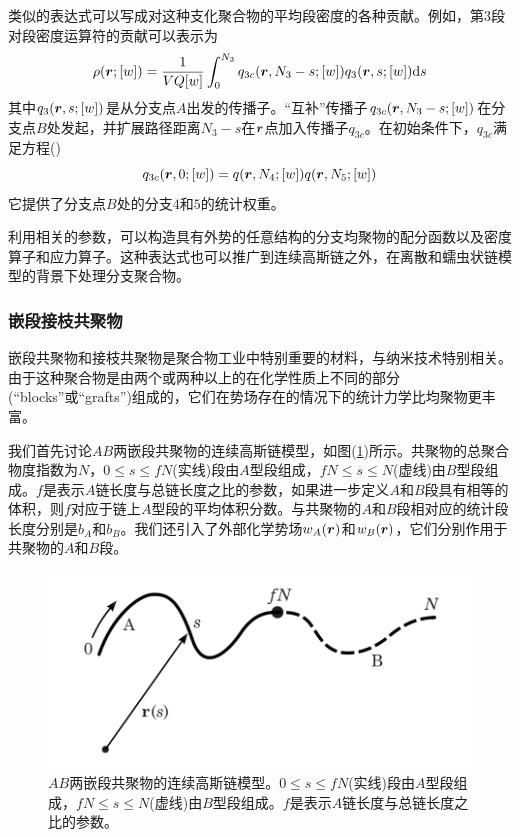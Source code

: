 类似的表达式可以写成对这种支化聚合物的平均段密度的各种贡献。例如，第$3$段对段密度运算符的贡献可以表示为
\begin{equation}
\rho(\bm{r};[w])=\frac{1}{VQ[w]}\int _{0}^{N_3} q_{3c}(\bm{r},N_3-s;[w])q_3(\bm{r},s;[w]) \mathrm{d}s
\end{equation}
其中$q_3(\bm{r},s;[w])$是从分支点$A$出发的传播子。“互补”传播子$q_{3c}(\bm{r},N_3-s;[w])$在分支点$B$处发起，并扩展路径距离$N_3-s$在$\bm{r}$点加入传播子$q_{3c}$。在初始条件下，$q_{3c}$满足方程(\label{传播子求导})
\begin{equation}
q_{3c}(\bm{r},0;[w])=q(\bm{r},N_4;[w])q(\bm{r},N_5;[w])
\end{equation}
它提供了分支点$B$处的分支$4$和$5$的统计权重。

利用相关的参数，可以构造具有外势的任意结构的分支均聚物的配分函数以及密度算子和应力算子。这种表达式也可以推广到连续高斯链之外，在离散和蠕虫状链模型的背景下处理分支聚合物。

\subsubsection{嵌段接枝共聚物}
嵌段共聚物和接枝共聚物是聚合物工业中特别重要的材料，与纳米技术特别相关。由于这种聚合物是由两个或两种以上的在化学性质上不同的部分(“blocks”或“grafts”)组成的，它们在势场存在的情况下的统计力学比均聚物更丰富。

我们首先讨论$AB$两嵌段共聚物的连续高斯链模型，如图(\ref{图37})所示。共聚物的总聚合物度指数为$N$，$0\leq s \leq fN$(实线)段由$A$型段组成，$fN \leq s \leq N$(虚线)由$B$型段组成。$f$是表示$A$链长度与总链长度之比的参数，如果进一步定义$A$和$B$段具有相等的体积，则$f$对应于链上$A$型段的平均体积分数。与共聚物的$A$和$B$段相对应的统计段长度分别是$b_A$和$b_B$。我们还引入了外部化学势场$w_A(\bm{r})$和$w_B(\bm{r})$，它们分别作用于共聚物的$A$和$B$段。

\begin{figure}[H]
\centering
\includegraphics[scale=0.7]{./figures/37.png}
\caption{$AB$两嵌段共聚物的连续高斯链模型。$0\leq s \leq fN$(实线)段由$A$型段组成，$fN \leq s \leq N$(虚线)由$B$型段组成。$f$是表示$A$链长度与总链长度之比的参数。}
\label{图37}
\end{figure}

